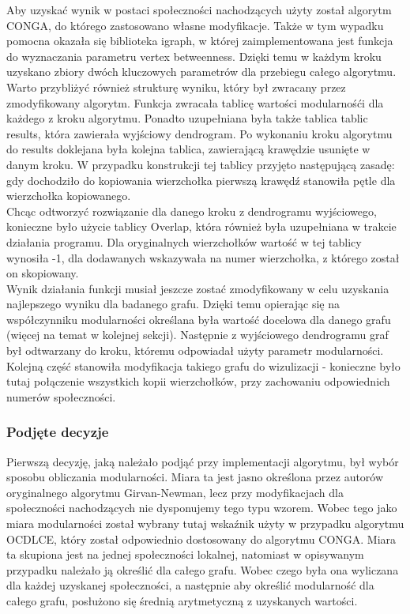 \documentclass{article}
\begin{document}
Aby uzyskać wynik w postaci społeczności nachodzących użyty został algorytm CONGA, do którego zastosowano własne modyfikacje. Także w tym wypadku pomocna okazała się biblioteka igraph, w której zaimplementowana jest funkcja do wyznaczania parametru vertex betweenness. Dzięki temu w każdym kroku uzyskano zbiory dwóch kluczowych parametrów dla przebiegu całego algorytmu.\\

Warto przybliżyć również strukturę wyniku, który był zwracany przez zmodyfikowany algorytm. Funkcja zwracała tablicę wartości modularnośći dla każdego z kroku algorytmu. Ponadto uzupełniana była także tablica tablic results, która zawierała wyjściowy dendrogram. Po wykonaniu kroku algorytmu do results doklejana była kolejna tablica, zawierającą krawędzie usunięte w danym kroku. W przypadku konstrukcji tej tablicy przyjęto następującą zasadę: gdy dochodziło do kopiowania wierzchołka pierwszą krawędź stanowiła pętle dla wierzchołka kopiowanego.\\

Chcąc odtworzyć rozwiązanie dla danego kroku z dendrogramu wyjściowego, konieczne było użycie tablicy Overlap, która również była uzupełniana w trakcie działania programu. Dla oryginalnych wierzchołków wartość w tej tablicy wynosiła -1, dla dodawanych wskazywała na numer wierzchołka, z którego został on skopiowany.\\

Wynik działania funkcji musiał jeszcze zostać zmodyfikowany w celu uzyskania najlepszego wyniku dla badanego grafu. Dzięki temu opierając się na współczynniku modularności określana była wartość docelowa dla danego grafu (więcej na temat w kolejnej sekcji). Następnie z wyjściowego dendrogramu graf był odtwarzany do kroku, któremu odpowiadał użyty parametr modularności. Kolejną część stanowiła modyfikacja takiego grafu do wizulizacji - konieczne było tutaj połączenie wszystkich kopii wierzchołków, przy zachowaniu odpowiednich numerów społeczności.

\subsubsection{Podjęte decyzje}
Pierwszą decyzję, jaką należało podjąć przy implementacji algorytmu, był wybór sposobu obliczania modularności. Miara ta jest jasno określona przez autorów oryginalnego algorytmu Girvan-Newman, lecz przy modyfikacjach dla społeczności nachodzących nie dysponujemy tego typu wzorem. Wobec tego jako miara modularności został wybrany tutaj wskaźnik użyty w przypadku algorytmu OCDLCE, który został odpowiednio dostosowany do algorytmu CONGA. Miara ta skupiona jest na jednej społeczności lokalnej, natomiast w opisywanym przypadku należało ją określić dla całego grafu. Wobec czego była ona wyliczana dla każdej uzyskanej społeczności, a następnie aby określić modularność dla całego grafu, posłużono się średnią arytmetyczną z uzyskanych wartości. \\
\end{document}
